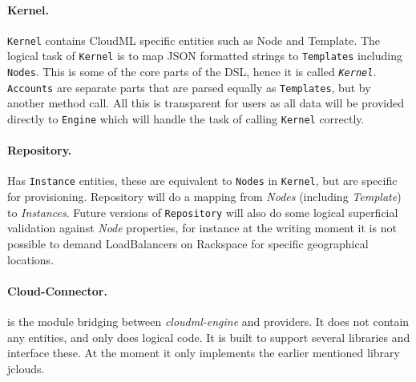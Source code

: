 \paragraph{Kernel.} \texttt{Kernel} contains CloudML specific entities such as Node and Template.
The logical task of \texttt{Kernel} is to map JSON formatted strings to \texttt{Templates} including \texttt{Nodes}.
This is some of the core parts of the DSL, hence it is called \emph{\texttt{Kernel}}.
\texttt{Accounts} are separate parts that are parsed equally as \texttt{Templates},
 but by another method call. All this is transparent for users as all data will
be provided directly to \texttt{Engine} which will handle the task
of calling \texttt{Kernel} correctly.

\paragraph{Repository.} Has \texttt{Instance} entities, these are equivalent to \texttt{Nodes} in \texttt{Kernel},
but are specific for provisioning. Repository will do a mapping from \emph{Nodes} (including \emph{Template})
to \emph{Instances}. Future versions of \texttt{Repository} will also do some logical superficial validation
against \emph{Node} properties, for instance at the writing moment it is not possible to 
demand LoadBalancers on Rackspace for specific geographical locations.

\paragraph{Cloud-Connector.} is the module bridging between \emph{cloudml-engine} and providers.
It does not contain any entities, and only does logical code. 
It is built to support several libraries and interface these. At the moment it only implements the earlier
mentioned library jclouds.

